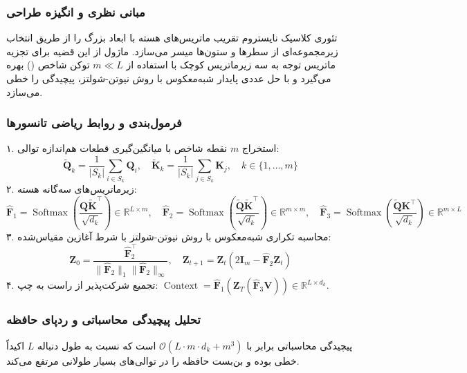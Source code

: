 \subsubsection*{مبانی نظری و انگیزه طراحی}
تئوری کلاسیک نایستروم تقریب ماتریس‌های هسته با ابعاد بزرگ را از طریق انتخاب زیرمجموعه‌ای از سطرها و ستون‌ها میسر می‌سازد. ماژول  از این قضیه برای تجزیه ماتریس توجه به سه زیرماتریس کوچک با استفاده از $m \ll L$ توکن شاخص () بهره می‌گیرد و با حل عددی پایدار شبه‌معکوس با روش نیوتن-شولتز، پیچیدگی را خطی می‌سازد.

\subsubsection*{فرمول‌بندی و روابط ریاضی تانسورها}
۱. استخراج $m$ نقطه شاخص با میانگین‌گیری قطعات هم‌اندازه توالی:
\begin{equation}
\widetilde{\mathbf{Q}}_k = \frac{1}{|S_k|} \sum_{i \in S_k} \mathbf{Q}_i, \quad \widetilde{\mathbf{K}}_k = \frac{1}{|S_k|} \sum_{j \in S_k} \mathbf{K}_j, \quad k \in \{1, \dots, m\}
\end{equation}
۲. زیرماتریس‌های سه‌گانه هسته:
\begin{equation}
\widehat{\mathbf{F}}_1 = \operatorname{Softmax}\left(\frac{\mathbf{Q} \widetilde{\mathbf{K}}^\top}{\sqrt{d_k}}\right) \in \mathbb{R}^{L \times m}, \quad \widehat{\mathbf{F}}_2 = \operatorname{Softmax}\left(\frac{\widetilde{\mathbf{Q}} \widetilde{\mathbf{K}}^\top}{\sqrt{d_k}}\right) \in \mathbb{R}^{m \times m}, \quad \widehat{\mathbf{F}}_3 = \operatorname{Softmax}\left(\frac{\widetilde{\mathbf{Q}} \mathbf{K}^\top}{\sqrt{d_k}}\right) \in \mathbb{R}^{m \times L}
\end{equation}
۳. محاسبه تکراری شبه‌معکوس با روش نیوتن-شولتز با شرط آغازین مقیاس‌شده:
\begin{equation}
\mathbf{Z}_0 = \frac{\widehat{\mathbf{F}}_2^\top}{\|\widehat{\mathbf{F}}_2\|_1 \|\widehat{\mathbf{F}}_2\|_\infty}, \quad \mathbf{Z}_{t+1} = \mathbf{Z}_t \left( 2 \mathbf{I}_m - \widehat{\mathbf{F}}_2 \mathbf{Z}_t \right)
\end{equation}
۴. تجمیع شرکت‌پذیر از راست به چپ: $\operatorname{Context} = \widehat{\mathbf{F}}_1 \left( \mathbf{Z}_T \left( \widehat{\mathbf{F}}_3 \mathbf{V} \right) \right) \in \mathbb{R}^{L \times d_k}$.

\subsubsection*{تحلیل پیچیدگی محاسباتی و ردپای حافظه}
پیچیدگی محاسباتی برابر با $\mathcal{O}(L \cdot m \cdot d_k + m^3)$ است که نسبت به طول دنباله $L$ اکیداً خطی بوده و بن‌بست حافظه را در توالی‌های بسیار طولانی مرتفع می‌کند.


